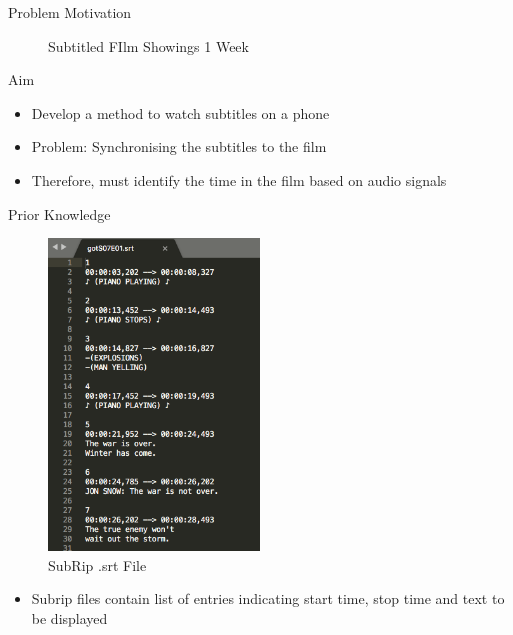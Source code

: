 \documentclass[notes]{beamer}
\begin{document}
\begin{frame}{Problem Motivation}
\begin{figure}
\begin{minipage}{0.45\textwidth}
		\caption{Subtitled FIlm Showings 1 Week}
	\end{minipage}
\end{figure}
\end{frame}



\begin{frame}{Aim}
\begin{itemize}
	\item Develop a method to watch subtitles on a phone
	\item Problem: Synchronising the subtitles to the film
	\item Therefore, must identify the time in the film based on audio signals
\end{itemize}
\end{frame}


\begin{frame}{Prior Knowledge}
\begin{figure}
	\centering
	\includegraphics[width=0.5\textwidth]{figures/srt}
	\caption{SubRip .srt File}
\end{figure}
\begin{itemize}
	\item Subrip files contain list of entries indicating start time, stop time and text to be displayed
\end{itemize}
\end{frame}
\end{document}
